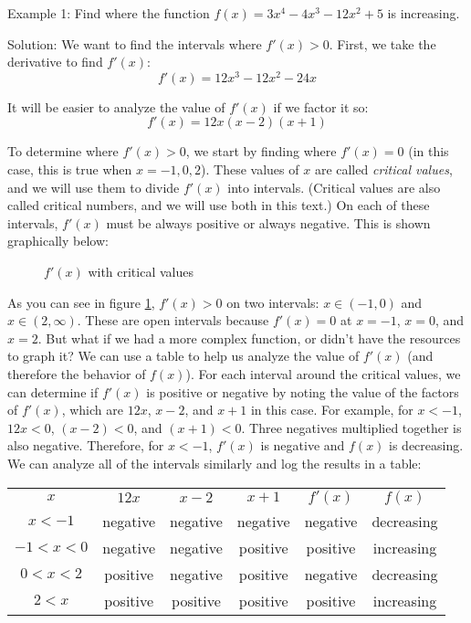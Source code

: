 Example 1: Find where the function $f(x) = 3x^4-4x^3-12x^2+5$ is increasing. 

Solution: We want to find the intervals where $f'(x)>0$. First, we take the derivative to find $f'(x)$:
$$f'(x) = 12x^3-12x^2-24x$$

It will be easier to analyze the value of $f'(x)$ if we factor it so:
$$f'(x) = 12x(x-2)(x+1)$$

To determine where $f'(x)>0$, we start by finding where $f'(x)=0$ (in this case, this is true when $x=-1, 0, 2$). These values of $x$ are called \textit{critical values}, and we will use them to divide $f'(x)$ into intervals. (Critical values are also called critical numbers, and we will use both in this text.) On each of these intervals, $f'(x)$ must be always positive or always negative. This is shown graphically below:

\begin{figure}
	\caption{$f'(x)$ with critical values}
	\label{fig:critval1}
\end{figure}


As you can see in figure \ref{fig:critval1}, $f'(x)>0$ on two intervals: $x \in (-1, 0) $ and $x \in (2, \infty)$. These are open intervals because $f'(x)=0$ at $x=-1$, $x=0$, and $x=2$. But what if we had a more complex function, or didn't have the resources to graph it? We can use a table to help us analyze the value of $f'(x)$ (and therefore the behavior of $f(x)$). For each interval around the critical values, we can determine if $f'(x)$ is positive or negative by noting the value of the factors of $f'(x)$, which are $12x$, $x-2$, and $x+1$ in this case. For example, for $x<-1$, $12x<0$, $(x-2)<0$, and $(x+1)<0$. Three negatives multiplied together is also negative. Therefore, for $x<-1$, $f'(x)$ is negative and $f(x)$ is decreasing. We can analyze all of the intervals similarly and log the results in a table:

\begin{tabular}{c | c | c |c|c|c}
\hline
$x$ & $12x$ & $x-2$ & $x+1$ & $f'(x)$ & $f(x)$ \\
$x<-1$ & negative & negative & negative & negative &decreasing\\
$-1<x<0$ & negative & negative & positive & positive & increasing \\
$0<x<2$ & positive & negative & positive & negative & decreasing \\
$2<x$ & positive & positive & positive & positive & increasing\\
\end{tabular}

